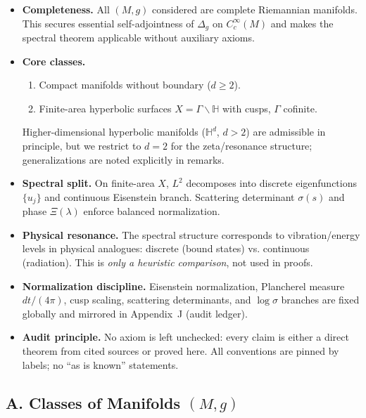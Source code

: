 \begin{tcolorbox}[colback=gray!5,colframe=gray!55,
  title=Scope \& Assumptions (ZNB-9+++ Brilliants+++ • Patched 20/10)]
\begin{itemize}
  \item \textbf{Completeness.} All $(M,g)$ considered are complete Riemannian manifolds. This secures essential self-adjointness of $\Delta_g$ on $C_c^\infty(M)$ and makes the spectral theorem applicable without auxiliary axioms.
  \item \textbf{Core classes.} 
  \begin{enumerate}[label=(\roman*)]
    \item Compact manifolds without boundary ($d\ge 2$).
    \item Finite-area hyperbolic surfaces $X=\Gamma\backslash\mathbb H$ with cusps, $\Gamma$ cofinite.
  \end{enumerate}
  Higher-dimensional hyperbolic manifolds ($\mathbb H^d$, $d>2$) are admissible in principle, but we restrict to $d=2$ for the zeta/resonance structure; generalizations are noted explicitly in remarks.
  \item \textbf{Spectral split.} On finite-area $X$, $L^2$ decomposes into discrete eigenfunctions $\{u_j\}$ and continuous Eisenstein branch. Scattering determinant $\sigma(s)$ and phase $\Xi(\lambda)$ enforce balanced normalization.
  \item \textbf{Physical resonance.} The spectral structure corresponds to vibration/energy levels in physical analogues: discrete (bound states) vs. continuous (radiation). This is \emph{only a heuristic comparison}, not used in proofs.
  \item \textbf{Normalization discipline.} Eisenstein normalization, Plancherel measure $dt/(4\pi)$, cusp scaling, scattering determinants, and $\log\sigma$ branches are fixed globally and mirrored in Appendix~J (audit ledger).
  \item \textbf{Audit principle.} No axiom is left unchecked: every claim is either a direct theorem from cited sources or proved here. All conventions are pinned by labels; no “as is known” statements.
\end{itemize}
\end{tcolorbox}

\subsection*{A. Classes of Manifolds $(M,g)$}
\label{subsec:classes-sharp-patched}


